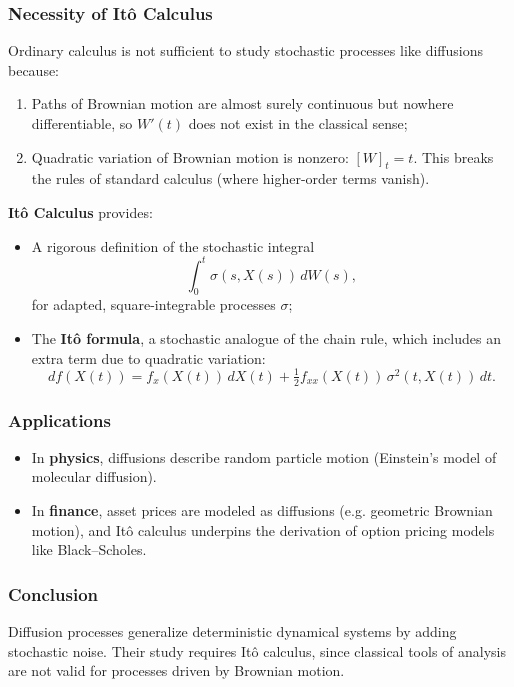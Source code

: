 \documentclass[12pt,a4paper]{book}
\theoremstyle{remark}
\begin{document}
\subsubsection*{Necessity of Itô Calculus}
Ordinary calculus is not sufficient to study stochastic processes like diffusions because:
\begin{enumerate}[label=\roman*)]
    \item Paths of Brownian motion are almost surely continuous but nowhere differentiable, so $W'(t)$ does not exist in the classical sense;
    \item Quadratic variation of Brownian motion is nonzero: $[W]_t = t$. This breaks the rules of standard calculus (where higher-order terms vanish).
\end{enumerate}

\textbf{Itô Calculus} provides:
\begin{itemize}
    \item A rigorous definition of the stochastic integral
    \[
    \int_0^t \sigma(s,X(s))\,dW(s),
    \]
    for adapted, square-integrable processes $\sigma$;
    \item The \textbf{Itô formula}, a stochastic analogue of the chain rule, which includes an extra term due to quadratic variation:
    \[
    df(X(t)) = f_x(X(t))\,dX(t) + \tfrac{1}{2} f_{xx}(X(t))\,\sigma^2(t,X(t))\,dt.
    \]
\end{itemize}

\subsubsection*{Applications}
\begin{itemize}
    \item In \textbf{physics}, diffusions describe random particle motion (Einstein’s model of molecular diffusion).
    \item In \textbf{finance}, asset prices are modeled as diffusions (e.g. geometric Brownian motion), and Itô calculus underpins the derivation of option pricing models like Black–Scholes.
\end{itemize}

\subsubsection*{Conclusion}
Diffusion processes generalize deterministic dynamical systems by adding stochastic noise. Their study requires Itô calculus, since classical tools of analysis are not valid for processes driven by Brownian motion.
\end{document}
